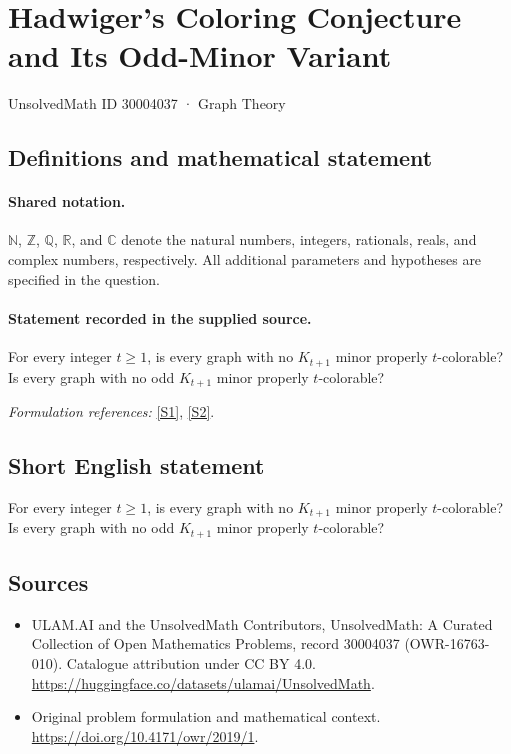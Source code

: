 \documentclass[11pt]{article}
\newcommand{\sref}[2]{\hyperlink{source:#1:#2}{[S#2]}}
\begin{document}
\setcounter{section}{30004036}
\section{Hadwiger’s Coloring Conjecture and Its Odd-Minor Variant}\label{30004037}
{\small UnsolvedMath ID 30004037 · Graph Theory}
\subsection{Definitions and mathematical statement}

\paragraph{Shared notation.}$\mathbb N$, $\mathbb Z$, $\mathbb Q$, $\mathbb R$, and $\mathbb C$ denote the natural numbers, integers, rationals, reals, and complex numbers, respectively. All additional parameters and hypotheses are specified in the question.


\paragraph{Statement recorded in the supplied source.}
For every integer $t\geq1$, is every graph with no $K_{t+1}$ minor properly $t$-colorable? Is every graph with no odd $K_{t+1}$ minor properly $t$-colorable?
\par\smallskip\textit{Formulation references:} \sref{30004037}{1}, \sref{30004037}{2}.
\subsection{Short English statement}
For every integer $t\geq1$, is every graph with no $K_{t+1}$ minor properly $t$-colorable? Is every graph with no odd $K_{t+1}$ minor properly $t$-colorable?
\subsection{Sources}
\begin{itemize}
\item[\hypertarget{source:30004037:1}{S1}] ULAM.AI and the UnsolvedMath Contributors, UnsolvedMath: A Curated Collection of Open Mathematics Problems, record 30004037 (OWR-16763-010). Catalogue attribution under CC BY 4.0.
\url{https://huggingface.co/datasets/ulamai/UnsolvedMath}.
\item[\hypertarget{source:30004037:2}{S2}] Original problem formulation and mathematical context.
\url{https://doi.org/10.4171/owr/2019/1}.
\end{itemize}
\label{end:30004037}
\end{document}
